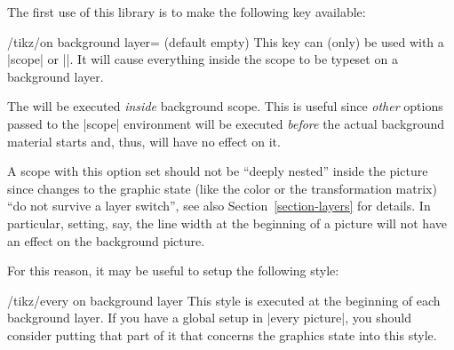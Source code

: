 The first use of this library is to make the following key available:
%
\begin{key}{/tikz/on background layer= (default \normalfont empty)}
    This key can (only) be used with a |{scope}| or |\scoped|. It will cause
    everything inside the scope to be typeset on a background layer.

    The  will be executed \emph{inside} background scope. This is
    useful since \emph{other} options passed to the |{scope}| environment will
    be executed \emph{before} the actual background material starts and, thus,
    will have no effect on it.
\begin{codeexample}[preamble={\usetikzlibrary{backgrounds}}]
\end{codeexample}

    A scope with this option set should not be ``deeply nested'' inside the
    picture since changes to the graphic state (like the color or the
    transformation matrix) ``do not survive a layer switch'', see also
    Section~\ref{section-layers} for details. In particular, setting, say, the
    line width at the beginning of a picture will not have an effect on the
    background picture.

    For this reason, it may be useful to setup the following style:
    \begin{stylekey}{/tikz/every on background layer}
        This style is executed at the beginning of each background layer. If
        you have a global setup in |every picture|, you should consider putting
        that part of it that concerns the graphics state into this style.
\begin{codeexample}[preamble={\usetikzlibrary{backgrounds}}]
\end{codeexample}
    \end{stylekey}
\end{key}


